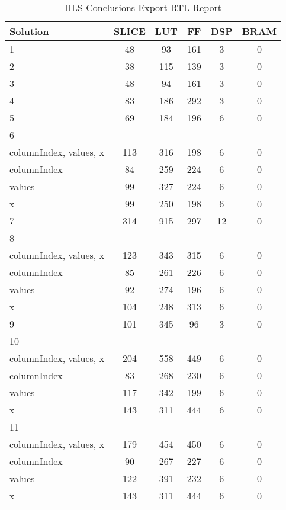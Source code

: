 \begin{table}[H]
	\centering
	\begin{tabular}{|l|c|c|c|c|c|}
		\hline
		\textbf{Solution} & \textbf{SLICE} & \textbf{LUT} & \textbf{FF} & \textbf{DSP} & \textbf{BRAM} \\
		\hline
		1 & 48 & 93 & 161 & 3 & 0 \\
		\hline
		2 & 38 & 115 & 139 & 3 & 0 \\
		\hline
		3 & 48 & 94 & 161 & 3 & 0 \\
		\hline
		4 & 83 & 186 & 292 & 3 & 0 \\
		\hline
		5 & 69 & 184 & 196 & 6 & 0 \\
		\hline
		6 &  &  &  &  & \\
		\tabitem columnIndex, values, x & 113 & 316 & 198 & 6 & 0 \\
		\tabitem columnIndex & 84 & 259 & 224 & 6 & 0 \\
		\tabitem values & 99 & 327 & 224 & 6 & 0 \\
		\tabitem x & 99 & 250 & 198 & 6 & 0 \\
		\hline
		7 & 314 & 915 & 297 & 12 & 0 \\
		\hline
		8 &  &  &  &  &  \\
		\tabitem columnIndex, values, x & 123 & 343 & 315 & 6 & 0 \\
		\tabitem columnIndex & 85 & 261 & 226 & 6 & 0 \\
		\tabitem values & 92 & 274 & 196 & 6 & 0 \\
		\tabitem x & 104 & 248 & 313 & 6 & 0 \\
		\hline
		9 & 101 & 345 & 96 & 3 & 0 \\
		\hline
		10 &  &  &  &  &  \\
		\tabitem columnIndex, values, x & 204 & 558 & 449 & 6 & 0 \\
		\tabitem columnIndex & 83 & 268 & 230 & 6 & 0 \\
		\tabitem values & 117 & 342 & 199 & 6 & 0 \\
		\tabitem x & 143 & 311 & 444 & 6 & 0 \\
		\hline
		11 &  &  &  &  &  \\
		\tabitem columnIndex, values, x & 179 & 454 & 450 & 6 & 0 \\
		\tabitem columnIndex & 90 & 267 & 227 & 6 & 0 \\
		\tabitem values & 122 & 391 & 232 & 6 & 0 \\
		\tabitem x & 143 & 311 & 444 & 6 & 0 \\
		\hline
	\end{tabular}
	\caption{HLS Conclusions Export RTL Report}
	\label{tab:hls-conclusions-export-rtl-report}
\end{table}

